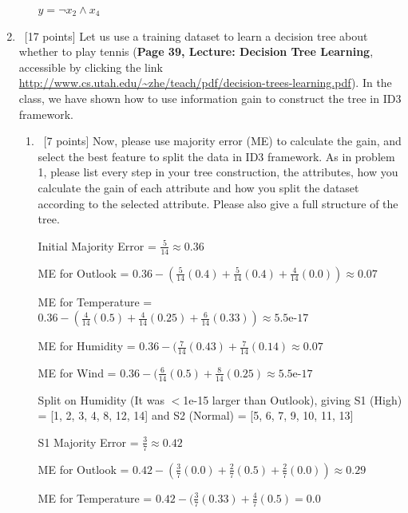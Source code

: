 \documentclass[12pt, fullpage,letterpaper]{article}
\begin{document}
\begin{enumerate}
\begin{enumerate}
\begin{framed}
	  \newline
	$y = \neg x_2 \land x_4$
\end{framed}
\end{enumerate}
\item~[17 points] Let us use a training dataset to learn a decision tree about whether to play tennis (\textbf{Page 39, Lecture: Decision Tree Learning}, accessible by clicking the link \href{http://www.cs.utah.edu/~zhe/teach/pdf/decision-trees-learning.pdf}{http://www.cs.utah.edu/\textasciitilde zhe/teach/pdf/decision-trees-learning.pdf}). In the class, we have shown how to use information gain to construct the tree in ID3 framework.  
\begin{enumerate}
	\item~[7 points] Now, please use majority error (ME) to calculate the gain, and select the best feature to split the data in ID3 framework. As in problem 1, please list every step in your tree construction,  the attributes,  how you calculate the gain of each attribute and how you split the dataset according to the selected attribute. Please also give a full structure of the tree.
	\begin{framed}
		  \newline
		Initial Majority Error = $\frac{5}{14} \approx 0.36$
		
		ME for Outlook = $0.36 - (\frac{5}{14}(0.4) + \frac{5}{14}(0.4) + \frac{4}{14}(0.0)) \approx 0.07$
		
		ME for Temperature = $0.36 - (\frac{4}{14}(0.5) + \frac{4}{14}(0.25) + \frac{6}{14}(0.33)) \approx 5.5 \text{e-} 17$ 
		
		ME for Humidity = $0.36 - (\frac{7}{14}(0.43) + \frac{7}{14}(0.14) \approx 0.07$
		
		ME for Wind = $0.36 - (\frac{6}{14}(0.5) + \frac{8}{14}(0.25) \approx 5.5 \text{e-} 17$
		
		Split on Humidity (It was $<$1e-15 larger than Outlook), giving S1 (High) = [1, 2, 3, 4, 8, 12, 14] and S2 (Normal) = [5, 6, 7, 9, 10, 11, 13]
		
		\bigskip
		
		S1 Majority Error = $\frac{3}{7} \approx 0.42$
		
		ME for Outlook = $0.42 - (\frac{3}{7}(0.0) + \frac{2}{7}(0.5) + \frac{2}{7}(0.0)) \approx 0.29$
		
		ME for Temperature = $0.42 - (\frac{3}{7}(0.33) + \frac{4}{7}(0.5) = 0.0$
		

\end{framed}
\end{enumerate}
\end{enumerate}
\end{document}

